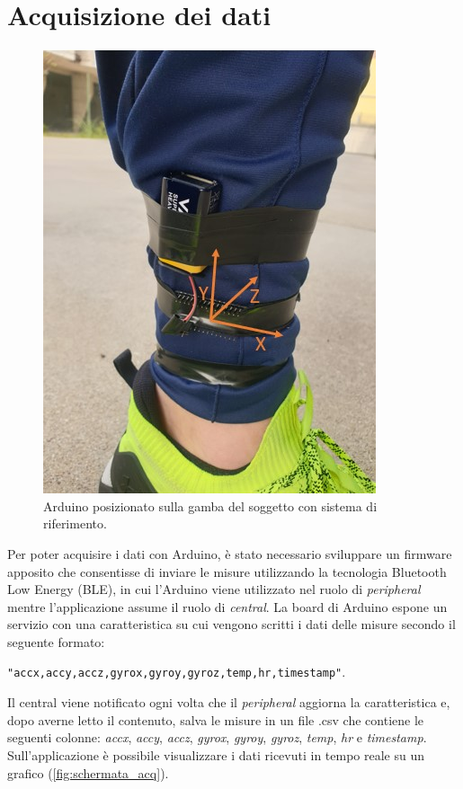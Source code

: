 \clearpage

\section{Acquisizione dei dati}
\begin{figure}[tbh]
	\centering
	\includegraphics[width=0.4\linewidth]{./ImageFiles/arduino_su_gamba_frame.jpg}
	\caption{Arduino posizionato sulla gamba del soggetto con sistema di riferimento.}
	\label{fig:arduino_su_gamba}
\end{figure}
Per poter acquisire i dati con Arduino, è stato necessario sviluppare un firmware apposito che consentisse di inviare le misure utilizzando la tecnologia Bluetooth Low Energy (BLE), in cui l'Arduino viene utilizzato nel ruolo di \textit{peripheral} mentre l'applicazione assume il ruolo di \textit{central}. La board di Arduino espone un servizio con una caratteristica su cui vengono scritti i dati delle misure secondo il seguente formato: \\
\centerline{\texttt{"accx,accy,accz,gyrox,gyroy,gyroz,temp,hr,timestamp"}.}
Il central viene notificato ogni volta che il \textit{peripheral} aggiorna la caratteristica e, dopo averne letto il contenuto, salva le misure in un file .csv che contiene le seguenti colonne: \textit{accx}, \textit{accy}, \textit{accz}, \textit{gyrox}, \textit{gyroy}, \textit{gyroz}, \textit{temp}, \textit{hr} e \textit{timestamp}. Sull'applicazione è possibile visualizzare i dati ricevuti in tempo reale su un grafico (\Fig\ref{fig:schermata_acq}).
